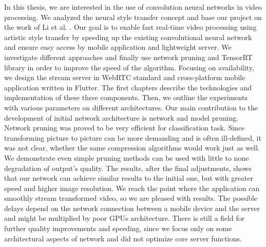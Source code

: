 \documentclass[../Main.tex]{subfiles}
\begin{document}
In this thesis, we are interested in the use of convolution neural networks in video processing. We analyzed the neural style transfer concept and base our project on the work of Li et al. \cite{Li2018}.
Our goal is to enable fast real-time video processing using artistic style transfer by speeding up the existing convolutional neural network and ensure easy access by mobile application and lightweight server.
We investigate different approaches and finally use network pruning and TensorRT library in order to improve the speed of the algorithm. Focusing on availability, we design the stream server in WebRTC standard and cross-platform mobile application written in Flutter. The first chapters describe the technologies and implementation of these three components. Then, we outline the experiments with various parameters on different architectures. Our main contribution to the development of initial
network architecture \cite{Li2018} is network and model pruning. Network pruning was proved to be very efficient
for classification task. Since transforming picture to picture can be more demanding and is often ill-defined,
it was not clear, whether the same compression algorithms would work just as well. We demonstrate even simple
pruning methods can be used with little to none degradation of output's quality.
The results, after the final adjustments, shows that our network can achieve similar results to the initial one, but with greater speed and higher image resolution. We reach the point where the application can smoothly stream transformed video, so we are pleased with results. The possible delays depend on the network connection between a mobile device and the server and might be multiplied by poor GPUs architecture. There is still a field for further quality improvements and speeding, since we focus only on some architectural aspects of network and did not optimize core server functions.

\par{} %


\biblio %
\end{document}
